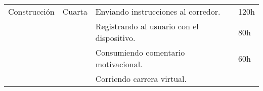 \begin{longtable}[c]{@{}llll@{}}
\\\noalign{\medskip}
\begin{minipage}[t]{0.17\columnwidth}\raggedright
Construcción
\end{minipage} & \begin{minipage}[t]{0.12\columnwidth}\raggedright
Cuarta
\end{minipage} & \begin{minipage}[t]{0.58\columnwidth}\raggedright
Enviando instrucciones al corredor.
\end{minipage} & \begin{minipage}[t]{0.12\columnwidth}\raggedright
120h
\end{minipage}
\\\noalign{\medskip}
\begin{minipage}[t]{0.17\columnwidth}\raggedright
\end{minipage} & \begin{minipage}[t]{0.12\columnwidth}\raggedright
\end{minipage} & \begin{minipage}[t]{0.58\columnwidth}\raggedright
Registrando al usuario con el dispositivo.
\end{minipage} & \begin{minipage}[t]{0.12\columnwidth}\raggedright
80h
\end{minipage}
\\\noalign{\medskip}
\begin{minipage}[t]{0.17\columnwidth}\raggedright
\end{minipage} & \begin{minipage}[t]{0.12\columnwidth}\raggedright
\end{minipage} & \begin{minipage}[t]{0.58\columnwidth}\raggedright
Consumiendo comentario motivacional.
\end{minipage} & \begin{minipage}[t]{0.12\columnwidth}\raggedright
60h
\end{minipage}
\\\noalign{\medskip}
\begin{minipage}[t]{0.17\columnwidth}\raggedright
\end{minipage} & \begin{minipage}[t]{0.12\columnwidth}\raggedright
\end{minipage} & \begin{minipage}[t]{0.58\columnwidth}\raggedright
Corriendo carrera virtual.
\end{minipage} & \begin{minipage}[t]{0.12\columnwidth}\raggedright

\end{minipage}
\end{longtable}
